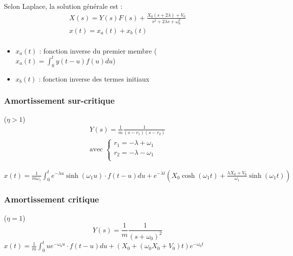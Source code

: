 \documentclass[../main.tex]{subfiles}
\begin{document}
Selon Laplace, la solution générale est : \begin{equation}
\begin{gathered}
    X(s) = Y(s)F(s) + \frac{X_0(s+2\lambda) + V_0}{s^2+2\lambda s+ \omega_0^2}\\
    x(t) = x_a(t) + x_b(t)\\
    \end{gathered}
\end{equation}

\begin{itemize}
    \item $x_a(t)$ : fonction inverse du premier membre ($x_a(t) = \int_0^ty(t-u)f(u)du$) \\
    \item $x_b(t)$ : fonction inverse des termes initiaux\\
\end{itemize}

\subsubsection{Amortissement sur-critique}
($\eta>1$)\\

\begin{equation}
    \begin{gathered}
        Y(s) = \frac{1}{m} \frac{1}{(s-r_1)(s-r_2)}\\
        \text{avec } \begin{cases}
            r_1 = -\lambda + \omega_1\\
            r_2 = -\lambda - \omega_1\\
        \end{cases}
    \end{gathered}
\end{equation}

$x(t) = \frac{1}{m\omega_1} \int_0^t e^{-\lambda u} \sinh{(\omega_1 u)} \cdot f(t-u)du + e^{-\lambda t} (X_0 \cosh{(\omega_1 t)} + \frac{\lambda X_0 + V_0}{\omega_1} \sinh{(\omega_1 t)})$\\

\subsubsection{Amortissement critique}
($\eta=1$)\\

\begin{equation}
    Y(s) = \frac{1}{m} \frac{1}{(s+\omega_0)^2}
\end{equation}
$x(t) = \frac{1}{m}\int_0^t ue^{-\omega_0u} \cdot f(t-u)du + (X_0 + (\omega_0X_0 + V_0)t)e^{-\omega_0t}$\\
\end{document}
